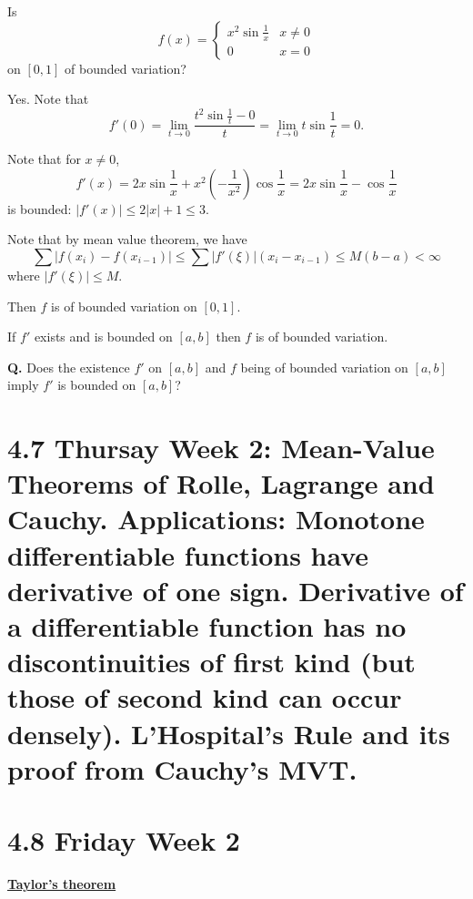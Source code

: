 \documentclass{notes}
\begin{document}
  \begin{eg}
    Is 
    \[
      f(x) = \begin{cases}
        x^2 \sin \frac{1}{x} & x \neq 0 \\ 
        0 & x = 0
      \end{cases}
    \]
    on $[0, 1]$ of bounded variation?
    
    Yes.
    Note that 
    \[
      f'(0) = \lim_{t \to 0} \frac{t^2 \sin \frac{1}{t} - 0}{t} = \lim_{t \to 0} t \sin \frac{1}{t} = 0.
    \]
    
    Note that for $x \neq 0$, 
    \[
      f'(x) = 2 x \sin \frac{1}{x} + x^2 \left ( -\frac{1}{x^2} \right ) \cos \frac{1}{x} = 2 x \sin \frac{1}{x} - \cos \frac{1}{x}
    \]
    is bounded: $\left | f'(x) \right | \leq 2 \left | x \right | + 1 \leq 3$.

    Note that by mean value theorem, we have 
    \[
      \sum \left | f(x_i) - f(x_{i - 1}) \right | \leq \sum \left | f'(\xi) \right | (x_i - x_{i - 1}) \leq M (b - a) < \infty
    \]
    where $\left | f'(\xi) \right | \leq M$.

    Then $f$ is of bounded variation on $[0, 1]$.
  \end{eg}
  
  \begin{thm}
    If $f'$ exists and is bounded on $[a, b]$ then $f$ is of bounded variation.
  \end{thm}
  
  {\boldmath \bfseries Q.} Does the existence $f'$ on $[a, b]$ and $f$ being of bounded variation on $[a, b]$ imply $f'$ is bounded on $[a, b]$?
  
  \section{4.7 Thursay Week 2: Mean-Value Theorems of Rolle, Lagrange and Cauchy. Applications: Monotone differentiable functions have \texorpdfstring{\newline}{}derivative of one sign. Derivative of a differentiable function has no discontinuities of first kind (but those of second kind can occur densely). L'Hospital's Rule and its proof from Cauchy's MVT.}
  
  \section{4.8 Friday Week 2}

  {\boldmath \bfseries \underline{Taylor's theorem}}
  
\end{document}
